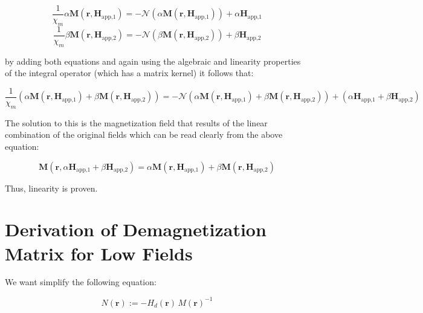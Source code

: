 \begin{equation}\label{eq:case1alpha}
\frac{1}{\chi_m}\alpha\textbf{M}(\textbf{r},\textbf{H}_\text{app,1})  = -\mathcal{N}(\alpha\textbf{M}(\textbf{r},\textbf{H}_\text{app,1})) + \alpha\textbf{H}_\text{app,1}
\end{equation}
\begin{equation}\label{eq:case2}
\frac{1}{\chi_m}\beta\textbf{M}(\textbf{r},\textbf{H}_\text{app,2})  = -\mathcal{N}(\beta\textbf{M}(\textbf{r},\textbf{H}_\text{app,2})) + \beta\textbf{H}_\text{app,2}
\end{equation}

by adding both equations and again using the algebraic and linearity properties of the integral operator (which has a matrix kernel) it follows that:

\begin{subequations}
\begin{equation}\label{eq:case1alpha}
\frac{1}{\chi_m}(\alpha\textbf{M}(\textbf{r},\textbf{H}_\text{app,1}) + \beta\textbf{M}(\textbf{r},\textbf{H}_\text{app,2}) )   = \end{equation}
\begin{equation}
 -\mathcal{N}(\alpha\textbf{M}(\textbf{r},\textbf{H}_\text{app,1}) + \beta\textbf{M}(\textbf{r},\textbf{H}_\text{app,2})) + (\alpha\textbf{H}_\text{app,1} + \beta\textbf{H}_\text{app,2})
\end{equation}
\end{subequations}

The solution to this is the magnetization field that results of the linear combination of the original fields which can be read clearly from the above equation:

\begin{equation}
\textbf{M}(\textbf{r},\alpha\textbf{H}_\text{app,1} + \beta\textbf{H}_\text{app,2}) = \alpha\textbf{M}(\textbf{r},\textbf{H}_\text{app,1}) + \beta\textbf{M}(\textbf{r},\textbf{H}_\text{app,2})
\end{equation}

Thus, linearity is proven.

\section{Derivation of Demagnetization Matrix for Low Fields}
\label{s:DemagPsi}

We want simplify the following equation:

\begin{equation}
N(\textbf{r}) := -H_d(\textbf{r})\,M(\textbf{r})^{-1}
\end{equation}

